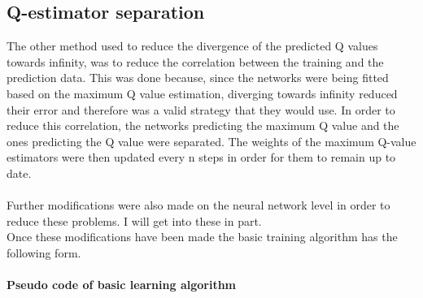 \subsection{Q-estimator separation}
The other method used to reduce the divergence of the predicted Q values towards infinity, was to reduce the correlation between the training and the prediction data. This was done because, since the networks were being fitted based on the maximum Q value estimation, diverging towards infinity reduced their error and therefore was a valid strategy that they would use. In order to reduce this correlation, the networks predicting the maximum Q value and the ones predicting the Q value were separated. The weights of the maximum Q-value estimators were then updated every n steps in order for them to remain up to date.\\
\mbox{}\\
Further modifications were also made on the neural network level in order to reduce these problems. I will get into these in part.\\
Once these modifications have been made the basic training algorithm has the following form.
\paragraph{Pseudo code of basic learning algorithm}

